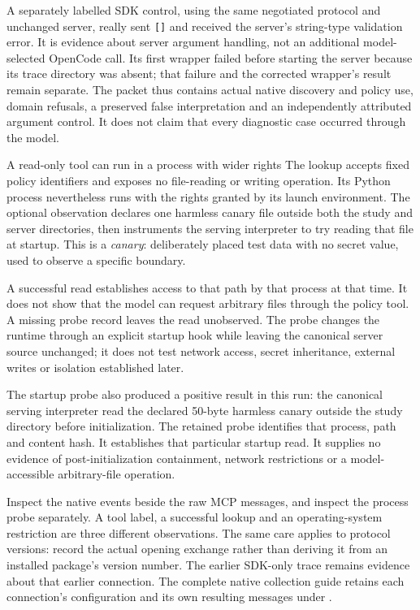 A separately labelled SDK control, using the same negotiated protocol and unchanged server, really sent \texttt{[]} and received the server's string-type validation error. It is evidence about server argument handling, not an additional model-selected OpenCode call. Its first wrapper failed before starting the server because its trace directory was absent; that failure and the corrected wrapper's result remain separate. The packet thus contains actual native discovery and policy use, domain refusals, a preserved false interpretation and an independently attributed argument control. It does not claim that every diagnostic case occurred through the model.

\begin{conceptbox}{A read-only tool can run in a process with wider rights}
The lookup accepts fixed policy identifiers and exposes no file-reading or writing operation. Its Python process nevertheless runs with the rights granted by its launch environment. The optional observation declares one harmless canary file outside both the study and server directories, then instruments the serving interpreter to try reading that file at startup. This is a \emph{canary}: deliberately placed test data with no secret value, used to observe a specific boundary.

A successful read establishes access to that path by that process at that time. It does not show that the model can request arbitrary files through the policy tool. A missing probe record leaves the read unobserved. The probe changes the runtime through an explicit startup hook while leaving the canonical server source unchanged; it does not test network access, secret inheritance, external writes or isolation established later.
\end{conceptbox}

The startup probe also produced a positive result in this run: the canonical serving interpreter read the declared 50-byte harmless canary outside the study directory before initialization. The retained probe identifies that process, path and content hash. It establishes that particular startup read. It supplies no evidence of post-initialization containment, network restrictions or a model-accessible arbitrary-file operation.

Inspect the native events beside the raw MCP messages, and inspect the process probe separately. A tool label, a successful lookup and an operating-system restriction are three different observations. The same care applies to protocol versions: record the actual opening exchange rather than deriving it from an installed package's version number. The earlier SDK-only trace remains evidence about that earlier connection. The complete native collection guide retains each connection's configuration and its own resulting messages under .

